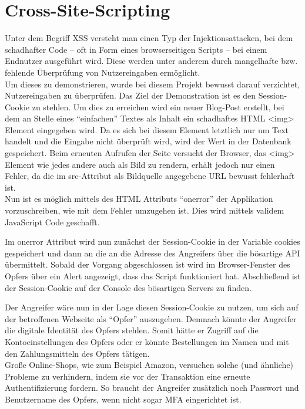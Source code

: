 \section{Cross-Site-Scripting}

Unter dem Begriff \ac{XSS} versteht man einen Typ der Injektionsattacken, bei dem schadhafter Code – oft in Form eines browserseitigen Scripts – bei einem Endnutzer ausgeführt wird. Diese werden unter anderem durch mangelhafte bzw. fehlende Überprüfung von Nutzereingaben ermöglicht. \\
Um dieses zu demonstrieren, wurde bei diesem Projekt bewusst darauf verzichtet, Nutzereingaben zu überprüfen. 
Das Ziel der Demonstration ist es den Session-Cookie zu stehlen. Um dies zu erreichen wird ein neuer Blog-Post erstellt, bei dem an Stelle eines ``einfachen'' Textes als Inhalt ein schadhaftes HTML <img> Element eingegeben wird. Da es sich bei diesem Element letztlich nur um Text handelt und die Eingabe nicht überprüft wird, wird der Wert in der Datenbank gespeichert. Beim erneuten Aufrufen der Seite versucht der Browser, das <img> Element wie jedes andere auch als Bild zu rendern, erhält jedoch nur einen Fehler, da die im src-Attribut als Bildquelle angegebene URL bewusst fehlerhaft ist. \\
Nun ist es möglich mittels des HTML Attributs ``onerror'' der Applikation vorzuschreiben, wie mit dem Fehler umzugehen ist. Dies wird mittels validem JavaScript Code geschafft. 

    

Im onerror Attribut wird nun zunächst der Session-Cookie in der Variable cookies gespeichert und dann an die an die Adresse des Angreifers über die bösartige API übermittelt. Sobald der Vorgang abgeschlossen ist wird im Browser-Fenster des Opfers über ein Alert angezeigt, dass das Script funktioniert hat. Abschließend ist der Session-Cookie auf der Console des bösartigen Servers zu finden.

Der Angreifer wäre nun in der Lage diesen Session-Cookie zu nutzen, um sich auf der betroffenen Webseite als ``Opfer'' auszugeben. Demnach könnte der Angreifer die digitale Identität des Opfers stehlen. 
Somit hätte er Zugriff auf die Kontoeinstellungen des Opfers oder er könnte Bestellungen im Namen und mit den Zahlungsmitteln des Opfers tätigen. \\
Große Online-Shops, wie zum Beispiel Amazon, versuchen solche (und ähnliche) Probleme zu verhindern, indem sie vor der Transaktion eine erneute Authentifizierung fordern. So braucht der Angreifer zusätzlich noch Passwort und Benutzername des Opfers, wenn nicht sogar MFA eingerichtet ist.


